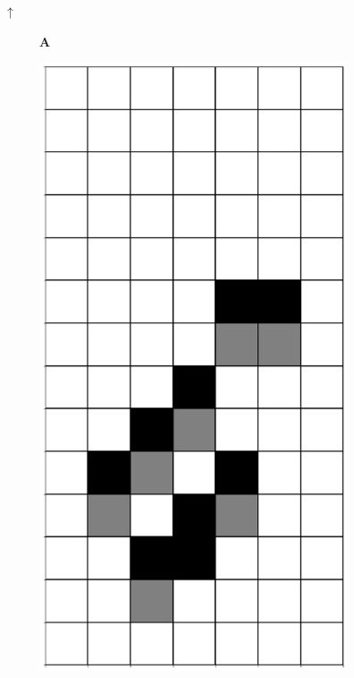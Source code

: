 \documentclass[12pt]{article}
\numberwithin{figure}{section} %
\begin{document}
\begin{figure}[H]
\color{blue}
\begin{center}
{\Huge$\uparrow$}
\end{center}
     	\begin{subfigure}[t]{0.03\textwidth}
    		\textbf{A}
  	\end{subfigure}	
 	\begin{subfigure}{0.18\textwidth}
     		\centering
     		\includegraphics[width=\linewidth]{Section4/15.0}

\end{subfigure}
\end{figure}
\end{document}
